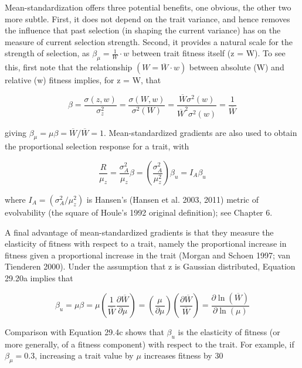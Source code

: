 \documentclass{article}
\begin{document}
Mean-standardization offers three potential benefits, one obvious, the other two more subtle. First, it does not depend on the trait variance, and hence removes the influence that past selection (in shaping the current variance) has on the measure of current selection strength. Second, it provides a natural scale for the strength of selection, as  $ \beta_{\mu} = \frac{1}{W} \cdot w $ between trait fitness itself (z = W). To see this, first note that the relationship  $ (W = \overline{W} \cdot w) $ between absolute (W) and relative (w) fitness implies, for z = W, that

\begin{equation}
\beta=\frac{\sigma(z,w)}{\sigma_{z}^{2}}=\frac{\sigma(W,w)}{\sigma^{2}(W)}=\frac{\overline{W}\sigma^{2}(w)}{\overline{W}^{2}\sigma^{2}(w)}=\frac{1}{\overline{W}}
\tag{29.33c}
\label{eq:29_33c}
\end{equation}

giving  $ \beta_{\mu} = \mu\beta = \overline{W}/\overline{W} = 1 $. Mean-standardized gradients are also used to obtain the proportional selection response for a trait, with

\begin{equation}
\frac{R}{\mu_{z}}=\frac{\sigma_{A}^{2}}{\mu_{z}}\beta=\left(\frac{\sigma_{A}^{2}}{\mu_{z}^{2}}\right)\beta_{u}=I_{A}\beta_{u}
\tag{29.33d}
\label{eq:29_33d}
\end{equation}

where  $ I_A = (\sigma_A^2/\mu_z^2) $ is Hansen's (Hansen et al. 2003, 2011) metric of evolvability (the square of Houle's 1992 original definition); see Chapter 6.

A final advantage of mean-standardized gradients is that they measure the elasticity of fitness with respect to a trait, namely the proportional increase in fitness given a proportional increase in the trait (Morgan and Schoen 1997; van Tienderen 2000). Under the assumption that z is Gaussian distributed, Equation 29.20a implies that

\begin{equation}
\beta_{u}=\mu\beta=\mu\left(\frac{1}{\overline{W}}\frac{\partial\overline{W}}{\partial\mu}\right)=\left(\frac{\mu}{\partial\mu}\right)\left(\frac{\partial\overline{W}}{\overline{W}}\right)=\frac{\partial\ln(\overline{W})}{\partial\ln(\mu)}
\tag{29.33e}
\label{eq:29_33e}
\end{equation}

Comparison with Equation 29.4c shows that  $ \beta_u $ is the elasticity of fitness (or more generally, of a fitness component) with respect to the trait. For example, if  $ \beta_\mu = 0.3 $, increasing a trait value by  $ \mu $ increases fitness by 30%
\end{document}
